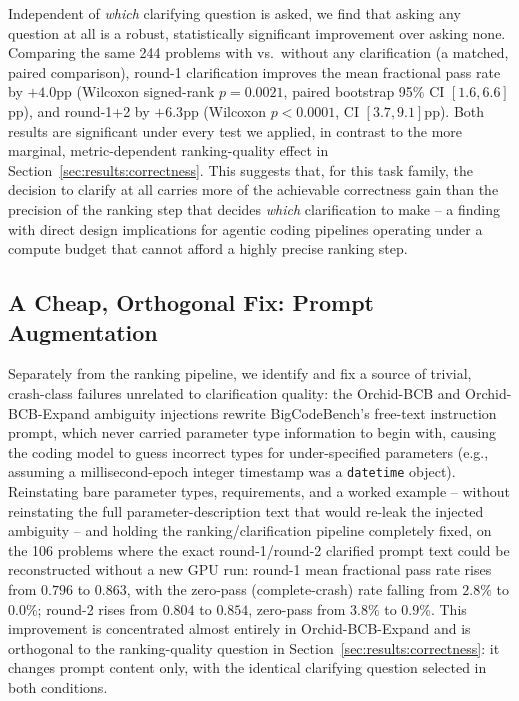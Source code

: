 Independent of \emph{which} clarifying question is asked, we find that
asking any question at all is a robust, statistically significant
improvement over asking none. Comparing the same 244 problems with vs.\
without any clarification (a matched, paired comparison), round-1
clarification improves the mean fractional pass rate by $+4.0$pp (Wilcoxon
signed-rank $p = 0.0021$, paired bootstrap 95\% CI $[1.6, 6.6]$pp), and
round-1+2 by $+6.3$pp (Wilcoxon $p < 0.0001$, CI $[3.7, 9.1]$pp). Both
results are significant under every test we applied, in contrast to the
more marginal, metric-dependent ranking-quality effect in
Section~\ref{sec:results:correctness}. This suggests that, for this task
family, the decision to clarify at all carries more of the achievable
correctness gain than the precision of the ranking step that decides
\emph{which} clarification to make -- a finding with direct design
implications for agentic coding pipelines operating under a compute
budget that cannot afford a highly precise ranking step.

\subsection{A Cheap, Orthogonal Fix: Prompt Augmentation}
\label{sec:results:augmentation}

Separately from the ranking pipeline, we identify and fix a source of
trivial, crash-class failures unrelated to clarification quality: the
Orchid-BCB and Orchid-BCB-Expand ambiguity injections rewrite BigCodeBench's
free-text instruction prompt, which never carried parameter type
information to begin with, causing the coding model to guess incorrect
types for under-specified parameters (e.g., assuming a millisecond-epoch
integer timestamp was a \texttt{datetime} object). Reinstating bare
parameter types, requirements, and a worked example -- without
reinstating the full parameter-description text that would re-leak the
injected ambiguity -- and holding the ranking/clarification pipeline
completely fixed, on the 106 problems where the exact round-1/round-2
clarified prompt text could be reconstructed without a new GPU run:
round-1 mean fractional pass rate rises from $0.796$ to $0.863$, with the
zero-pass (complete-crash) rate falling from $2.8\%$ to $0.0\%$; round-2
rises from $0.804$ to $0.854$, zero-pass from $3.8\%$ to $0.9\%$. This
improvement is concentrated almost entirely in Orchid-BCB-Expand and is
orthogonal to the ranking-quality question in
Section~\ref{sec:results:correctness}: it changes prompt content only, with
the identical clarifying question selected in both conditions.
